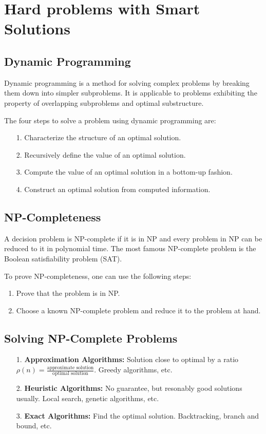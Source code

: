 \documentclass{article}
\begin{document}
\section{Hard problems with Smart Solutions}
\subsection{Dynamic Programming}
Dynamic programming is a method for solving complex problems by breaking them down into simpler subproblems. It is applicable to problems exhibiting the property of overlapping subproblems and optimal substructure.

The four steps to solve a problem using dynamic programming are:
\begin{enumerate}
  \item[1.] Characterize the structure of an optimal solution.
  \item[2.] Recursively define the value of an optimal solution.
  \item[3.] Compute the value of an optimal solution in a bottom-up fashion.
  \item[4.] Construct an optimal solution from computed information.
\end{enumerate}

\subsection{NP-Completeness}
A decision problem is NP-complete if it is in NP and every problem in NP can be reduced to it in polynomial time. The most famous NP-complete problem is the Boolean satisfiability problem (SAT).

To prove NP-completeness, one can use the following steps:
\begin{enumerate}
  \item Prove that the problem is in NP.
  \item Choose a known NP-complete problem and reduce it to the problem at hand.
\end{enumerate}

\subsection{Solving NP-Complete Problems}
\begin{enumerate}
  \item[1.] \textbf{Approximation Algorithms:} Solution close to optimal by a ratio $\rho(n) = \frac{\text{approximate solution}}{\text{optimal solution}}$. Greedy algorithms, etc.
  \item[2.] \textbf{Heuristic Algorithms:} No guarantee, but resonably good solutions usually. Local search, genetic algorithms, etc.
  \item[3.] \textbf{Exact Algorithms:} Find the optimal solution. Backtracking, branch and bound, etc.
\end{enumerate}
\end{document}

